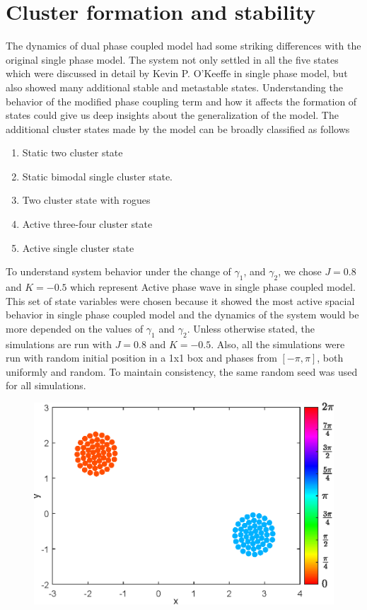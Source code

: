 \documentclass[superscriptaddress,reprint,amssymb, amsmath,aps, pre]{revtex4-1}
\begin{document}
\section{Cluster formation and stability}
{
    The dynamics of dual phase coupled model had some striking differences with the original single phase model. The system not only settled in all the five states which were discussed in detail by Kevin P. O'Keeffe in single phase model, but also showed many additional stable and metastable states. Understanding the behavior of the modified phase coupling term and how it affects the formation of states could give us deep insights about the generalization of the model.
    The additional cluster states made by the model can be broadly classified as follows 
    \begin{enumerate}[label = (\alph*)]
        \item Static two cluster state
        \item Static bimodal single cluster state.
        \item Two cluster state with rogues 
        \item Active three-four cluster state
        \item Active single cluster state
    \end{enumerate}
    \noindent
    To understand system behavior under the change of \(\gamma_1\), and \(\gamma_2\), we chose \(J = 0.8\) and \(K = -0.5\) which represent Active phase wave in single phase coupled model. This set of state variables were chosen because it showed the most active spacial behavior in single phase coupled model and the dynamics of the system would be more depended on the values of \(\gamma_1\) and \(\gamma_2\). Unless otherwise stated, the simulations are run with \(J = 0.8\) and \(K = -0.5\). Also, all the simulations were run with random initial position in a 1x1 box and phases from \([-\pi, \pi]\), both uniformly and random. To maintain consistency, the same random seed was used for all simulations.
    \begin{figure}
        \includegraphics[width = \linewidth]{TwoCluster.eps}

\end{figure}}
\end{document}
